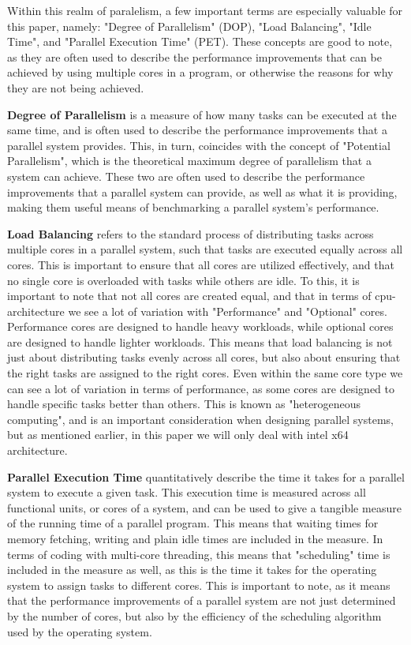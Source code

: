 \documentclass[12pt,a4paper]{article}
\begin{document}
Within this realm of paralelism, a few important terms are especially valuable for this paper, namely: "Degree of Parallelism" (DOP)\parencite[pp. 11-13]{Rauber2023}, "Load Balancing"\parencite[p. 5]{Rauber2023}, "Idle Time"\parencite[p. 5]{Rauber2023}, and "Parallel Execution Time" (PET)\parencite[p. 5]{Rauber2023}. These concepts are good to note, as they are often used to describe the performance improvements that can be achieved by using multiple cores in a program, or otherwise the reasons for why they are not being achieved.

\textbf{Degree of Parallelism} is a measure of how many tasks can be executed at the same time, and is often used to describe the performance improvements that a parallel system provides. This, in turn, coincides with the concept of "Potential Parallelism", which is the theoretical maximum degree of parallelism that a system can achieve. These two are often used to describe the performance improvements that a parallel system can provide, as well as what it is providing, making them useful means of benchmarking a parallel system's performance.

\textbf{Load Balancing} refers to the standard process of distributing tasks across multiple cores in a parallel system, such that tasks are executed equally across all cores. This is important to ensure that all cores are utilized effectively, and that no single core is overloaded with tasks while others are idle. To this, it is important to note that not all cores are created equal, and that in terms of cpu-architecture we see a lot of variation with "Performance" and "Optional" cores. Performance cores are designed to handle heavy workloads, while optional cores are designed to handle lighter workloads. This means that load balancing is not just about distributing tasks evenly across all cores, but also about ensuring that the right tasks are assigned to the right cores. Even within the same core type we can see a lot of variation in terms of performance, as some cores are designed to handle specific tasks better than others. This is known as "heterogeneous computing", and is an important consideration when designing parallel systems, but as mentioned earlier, in this paper we will only deal with intel x64 architecture.

\textbf{Parallel Execution Time} quantitatively describe the time it takes for a parallel system to execute a given task. This execution time is measured across all functional units, or cores of a system, and can be used to give a tangible measure of the running time of a parallel program. This means that waiting times for memory fetching, writing and plain idle times are included in the measure. In terms of coding with multi-core threading, this means that "scheduling" time is included in the measure as well, as this is the time it takes for the operating system to assign tasks to different cores. This is important to note, as it means that the performance improvements of a parallel system are not just determined by the number of cores, but also by the efficiency of the scheduling algorithm used by the operating system.
\end{document}
